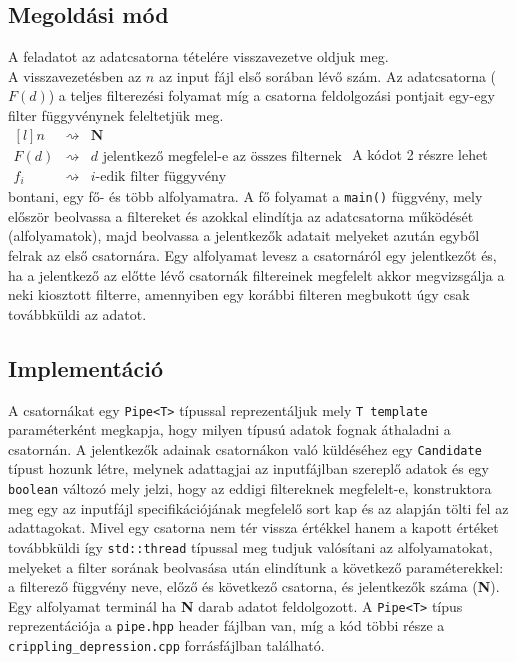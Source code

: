 \documentclass[12pt]{article}
\begin{document}
\subsection{Megoldási mód}
A feladatot az adatcsatorna tételére visszavezetve oldjuk meg.\\
A visszavezetésben az $n$ az input fájl első sorában lévő szám. Az adatcsatorna ($F(d)$) a
teljes filterezési folyamat míg a csatorna feldolgozási pontjait egy-egy filter függyvénynek
feleltetjük meg.\br
$
\begin{matrix}[l]
	n & \rightsquigarrow & \textbf{N} \\
	F(d) & \rightsquigarrow & d\text{ jelentkező megfelel-e az összes filternek} \\
	f_i & \rightsquigarrow  & i\text{-edik filter függyvény}
\end{matrix}
$\br
A kódot 2 részre lehet bontani, egy fő- és több alfolyamatra. A fő folyamat a \verb|main()|
függvény, mely először beolvassa a filtereket és azokkal elindítja az adatcsatorna működését
(alfolyamatok), majd beolvassa a jelentkezők adatait melyeket azután egyből felrak az első csatornára.\br
Egy alfolyamat levesz a csatornáról egy jelentkezőt és, ha a jelentkező az előtte lévő
csatornák filtereinek megfelelt akkor megvizsgálja a neki kiosztott filterre, amennyiben
egy korábbi filteren megbukott úgy csak továbbküldi az adatot.

\subsection{Implementáció}
A csatornákat egy \verb|Pipe<T>| típussal reprezentáljuk mely \verb|T template| paraméterként
megkapja, hogy milyen típusú adatok fognak áthaladni a csatornán.
A jelentkezők adainak csatornákon való küldéséhez egy \verb|Candidate| típust hozunk létre, 
melynek adattagjai az inputfájlban szereplő adatok és egy \verb|boolean| változó mely jelzi,
hogy az eddigi filtereknek megfelelt-e, konstruktora meg egy az inputfájl specifikációjának
megfelelő sort kap és az alapján tölti fel az adattagokat. Mivel egy csatorna nem tér vissza
értékkel hanem a kapott értéket továbbküldi így \verb|std::thread| típussal meg tudjuk
valósítani az alfolyamatokat, melyeket a filter sorának beolvasása után elindítunk
a következő paraméterekkel: a filterező függvény neve, előző és következő csatorna, és
jelentkezők száma (\textbf{N}). Egy alfolyamat terminál ha \textbf{N} darab adatot feldolgozott.
A \verb|Pipe<T>| típus reprezentációja a \verb|pipe.hpp| header fájlban van, míg a kód többi
része a \verb|crippling_depression.cpp| forrásfájlban található.
\end{document}
